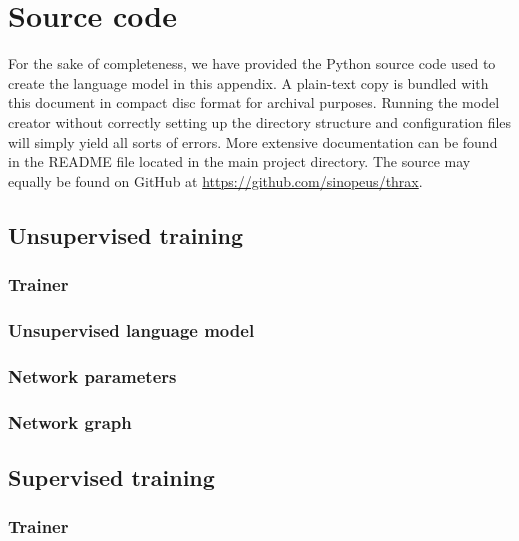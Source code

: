 \chapter{Source code}
\label{chp:sourcecode}
For the sake of completeness, we have provided the Python source code
used to create the language model in this appendix. A plain-text copy
is bundled with this document in compact disc format for archival
purposes. Running the model creator without correctly setting up the
directory structure and configuration files will simply yield all
sorts of errors. More extensive documentation can be found in the
README file located in the main project directory. The source may
equally be found on GitHub at \url{https://github.com/sinopeus/thrax}.

\section{Unsupervised training}
\subsection{Trainer}
\label{sec:trainer}

\subsection{Unsupervised language model}
\label{sec:langmodel}

\subsection{Network parameters}
\label{sec:nnetworkparams}

\subsection{Network graph}
\label{sec:modelcost}


\section{Supervised training}
\subsection{Trainer}
\label{sec:trainer}

